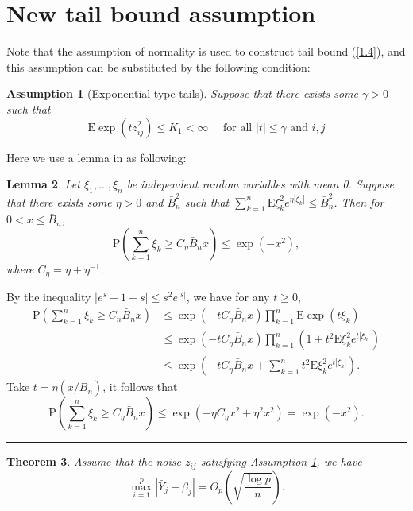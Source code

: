 \documentclass[12pt]{article}
\numberwithin{equation}{section}
\newtheorem{theorem}{Theorem}[section]
\newtheorem{lemma}[theorem]{Lemma}
\newtheorem{assumption}[theorem]{Assumption}
\newenvironment{proof}{{\bf Proof:}}{\hfill\rule{2mm}{2mm}}
\begin{document}
\section{New tail bound assumption}
Note that the assumption of normality is used to construct tail bound (\ref{1.4}), and this assumption can be substituted by the following condition:
\begin{assumption}[Exponential-type tails]\label{assumption2.1}
	Suppose that there exists some $\gamma>0$ such that
	\begin{equation}
	\mathrm{E} \exp \left(t z_{ij}^{2}\right) \leq K_{1}<\infty \quad \text { for all }|t| \leq \gamma \text { and } i, j
	\end{equation}
\end{assumption}
Here we use a lemma in \citet{Cai2011} as following:
\begin{lemma}
	Let $\xi_{1}, \dots, \xi_{n}$ be independent random variables with mean 0. Suppose that there exists some $\eta>0$ and $\bar{B}_{n}^{2}$ such that $\sum_{k=1}^{n} \mathrm{E} \xi_{k}^{2} e^{\eta\left|\xi_{k}\right|} \leq \bar{B}_{n}^{2}$. Then for $0<x \leq \bar{B}_{n}$, 
	\begin{equation}
	\mathrm{P}\left(\sum_{k=1}^{n} \xi_{k} \geq C_{\eta} \bar{B}_{n} x\right) \leq \exp \left(-x^{2}\right),
	\end{equation}
	where $C_{\eta}=\eta+\eta^{-1}$.
\end{lemma}
\begin{proof}
	By the inequality $\left|e^{s}-1-s\right| \leq s^{2} e^{|s|}$, we have for any $t\geq 0$,
	\begin{align*}
	\mathrm{P}\left(\sum_{k=1}^{n} \xi_{k} \geq C_{n} \bar{B}_{n} x\right) & \leq \exp \left(-t C_{\eta} \bar{B}_{n} x\right) \prod_{k=1}^{n} \mathrm{E} \exp \left(t \xi_{k}\right) \\
	& \leq \exp \left(-t C_{\eta} \bar{B}_{n} x\right) \prod_{k=1}^{n}\left(1+t^{2} \mathrm{E} \xi_{k}^{2} e^{t\left|\xi_{k}\right|}\right) \\
	& \leq \exp \left(-t C_{\eta} \bar{B}_{n} x+\sum_{k=1}^{n} t^{2} \mathrm{E} \xi_{k}^{2} e^{t\left|\xi_{k}\right|}\right).
	\end{align*}
	Take $t=\eta\left(x / \bar{B}_{n}\right)$, it follows that
	$$
	\mathrm{P}\left(\sum_{k=1}^{n} \xi_{k} \geq C_{\eta} \bar{B}_{n} x\right) \leq \exp \left(-\eta C_{\eta} x^{2}+\eta^{2} x^{2}\right)=\exp \left(-x^{2}\right).
	$$
\end{proof}
\begin{theorem}
	Assume that the noise $z_{ij}$ satisfying Assumption \ref{assumption2.1}, we have
	\begin{equation}
	\max _{i=1}^{p}\left|\bar Y_{j}-\beta_{j}\right| = O_p\left(\sqrt{\frac{\log p}{n}}\right).
	\end{equation}
\end{theorem}
\end{document}
